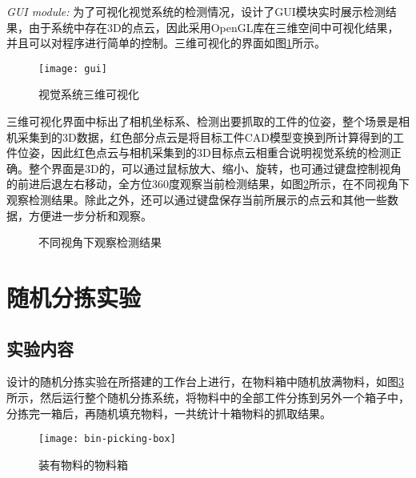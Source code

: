 \emph{GUI module:}
为了可视化视觉系统的检测情况，设计了GUI模块实时展示检测结果，由于系统中存在3D的点云，因此采用OpenGL库在三维空间中可视化结果，并且可以对程序进行简单的控制。三维可视化的界面如图\ref{fig:gui}所示。
\begin{figure}[ht]
  \centering
  \texttt{[image: gui]}
  \caption{视觉系统三维可视化}
  \label{fig:gui}
\end{figure}
三维可视化界面中标出了相机坐标系、检测出要抓取的工件的位姿，整个场景是相机采集到的3D数据，红色部分点云是将目标工件CAD模型变换到所计算得到的工件位姿，因此红色点云与相机采集到的3D目标点云相重合说明视觉系统的检测正确。整个界面是3D的，可以通过鼠标放大、缩小、旋转，也可通过键盘控制视角的前进后退左右移动，全方位360度观察当前检测结果，如图\ref{fig:view-pose}所示，在不同视角下观察检测结果。除此之外，还可以通过键盘保存当前所展示的点云和其他一些数据，方便进一步分析和观察。
\begin{figure}[ht]
  \centering
  \hfill
  \caption{不同视角下观察检测结果}
  \label{fig:view-pose}
\end{figure}

\section{随机分拣实验}
\subsection{实验内容}
设计的随机分拣实验在所搭建的工作台上进行，在物料箱中随机放满物料，如图\ref{fig:bin-picking-box}所示，然后运行整个随机分拣系统，将物料中的全部工件分拣到另外一个箱子中，分拣完一箱后，再随机填充物料，一共统计十箱物料的抓取结果。
\begin{figure}[ht]
  \centering
  \texttt{[image: bin-picking-box]}
  \caption{装有物料的物料箱}
  \label{fig:bin-picking-box}
\end{figure}

